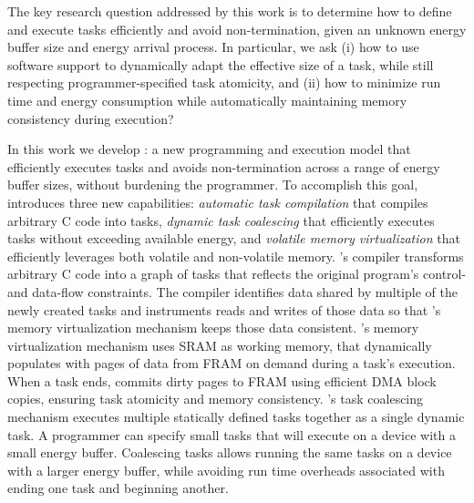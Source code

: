 The key research question addressed by this work is to determine how to define
and execute tasks efficiently and avoid non-termination, given an unknown
energy buffer size and energy arrival process. In particular, we ask (i) how to
use software support to dynamically adapt the effective size of a task, while
still respecting programmer-specified task atomicity, and (ii) how to minimize
run time and energy consumption while automatically maintaining memory
consistency during execution?

 In this work we develop {\bf \sys}: a new programming and execution
model that efficiently executes tasks and avoids non-termination across a range
of energy buffer sizes, without burdening the programmer.
%
To accomplish this goal, \sys introduces three new capabilities: {\em automatic
task compilation} that compiles arbitrary C code into tasks, {\em dynamic task
coalescing} that efficiently executes tasks without exceeding available energy,
and {\em volatile memory virtualization} that efficiently leverages both
volatile and non-volatile memory.  
%
\sys's compiler transforms arbitrary C code into a graph of tasks that reflects
the original program's control- and data-flow constraints.  The compiler
identifies data shared by multiple of the newly created tasks and instruments
reads and writes of those data so that \sys's memory virtualization mechanism
keeps those data consistent.
%
\sys's memory virtualization mechanism uses SRAM as working memory, that \sys
dynamically populates with pages of data from FRAM on demand during a task's
execution.  When a task ends, \sys commits dirty pages to FRAM using efficient
DMA block copies, ensuring task atomicity and memory consistency.
%
\sys's task coalescing mechanism executes multiple statically defined tasks
together as a single dynamic task. A programmer can specify small tasks that
will execute on a device with a small energy buffer. Coalescing tasks allows
running the same tasks on a device with a larger energy buffer, while avoiding
run time overheads associated with ending one task and beginning another.  
%

%

